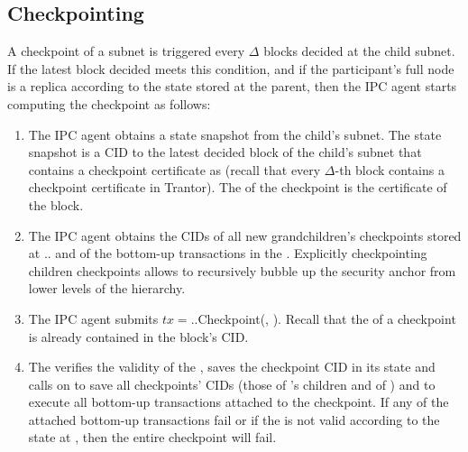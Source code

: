\subsection{Checkpointing} 
\label{sec:refimplcheck} A checkpoint of a subnet  is triggered every $\Delta$ blocks decided at the child subnet. If the latest block decided meets this condition, and if the participant's full node is a replica according to the state stored at the parent, then the IPC agent starts computing the checkpoint as follows:
\begin{enumerate}
    \item The IPC agent obtains a state snapshot from the child's subnet. The state snapshot is a CID  to the latest decided block of the child's subnet that contains a checkpoint certificate as \pof  (recall that every $\Delta$-th block contains a checkpoint certificate in Trantor). The \pof of the checkpoint is the certificate of the block.
    \item The IPC agent obtains the CIDs of all new grandchildren's checkpoints stored at .\gw. and of the bottom-up transactions in the \bqueue {}. Explicitly checkpointing children checkpoints allows to recursively bubble up the security anchor from lower levels of the hierarchy.
    \item The IPC agent submits $tx=$..Checkpoint(, ). Recall that the \pof of a checkpoint is already contained in the block's CID.
    \item The  verifies the validity of the \pof, saves the checkpoint CID in its state and calls on \gw to save all checkpoints' CIDs (those of 's children and of ) and to execute all bottom-up transactions attached to the checkpoint. If any of the attached bottom-up transactions fail or if the \pof is not valid according to the state at , then the entire checkpoint will fail.
\end{enumerate}
